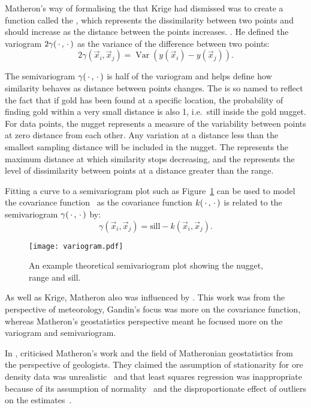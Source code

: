 Matheron's way of formalising the  that Krige had dismissed was to create a function called the , which represents the dissimilarity between two points and should increase as the distance between the points increases.
.
He defined the variogram \(2\gamma(\,\cdot\,, \,\cdot\,)\) as the variance of the difference between two points:
\[ 2\gamma(\vec{x}_i, \vec{x}_j) = \operatorname{Var}\left(y(\vec{x}_i) - y(\vec{x}_j)\right). \]

The semivariogram \(\gamma(\,\cdot\,,\,\cdot\,)\) is half of the variogram and helps define how similarity behaves as distance between points changes.
The  is so named to reflect the fact that if gold has been found at a specific location, the probability of finding gold within a very small distance is also 1, i.e.\ still inside the gold nugget.
For data points, the nugget represents a measure of the variability between points at zero distance from each other.
Any variation at a distance less than the smallest sampling distance will be included in the nugget.
The  represents the maximum distance at which similarity stops decreasing, and the  represents the level of dissimilarity between points at a distance greater than the range.

Fitting a curve to a semivariogram plot such as Figure~\ref{variogram} can be used to model the covariance function~\autocite[305]{diggle2002} as the covariance function \(k(\,\cdot\,, \,\cdot\,)\) is related to the semivariogram \(\gamma(\,\cdot\,, \,\cdot\,)\) by:
\[ \gamma(\vec{x}_i, \vec{x}_j) = \text{sill} - k(\vec{x}_i, \vec{x}_j). \]

\begin{figure}[htbp]
\centering
\texttt{[image: variogram.pdf]}
\caption{An example theoretical semivariogram plot showing the nugget, range and sill.}
\label{variogram}
\end{figure}

As well as Krige, Matheron also was influenced by \textcite[translated into English in 1966]{gandin1963}.
This work was from the perspective of meteorology, Gandin's focus was more on the covariance function, whereas Matheron's geostatistics perspective meant he focused more on the variogram and semivariogram.

In \citeyear{philip1986}, \citeauthor{philip1986} criticised Matheron's work and the field of Matheronian geostatistics from the perspective of geologists.
They claimed the assumption of stationarity for ore density data was unrealistic~\autocite[86--87]{philip1986} and that least squares regression was inappropriate because of its assumption of normality~\autocite[101--102]{philip1986} and the disproportionate effect of outliers on the estimates~\autocite[102]{philip1986}.

